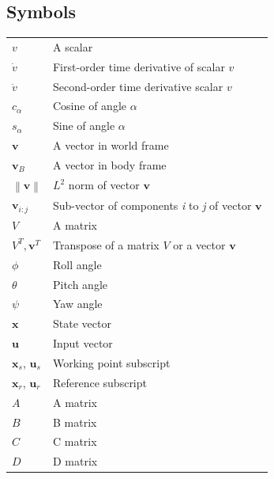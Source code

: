 \documentclass[a4paper, 12pt]{report}
\newcommand\norm[1]{\left\lVert#1\right\rVert}
\begin{document}
\subsection*{Symbols}
\begin{table}[h]
\centering
\begin{tabular}{p{8cm} p{8cm}}
$v$ \dotfill & A scalar \\
$\dot v$ \dotfill & First-order time derivative of scalar $v$ \\
$ \ddot v$ \dotfill & Second-order time derivative scalar $v$\\
$c_{\alpha}$ \dotfill & Cosine of angle $\alpha$ \\
$s_{\alpha}$ \dotfill & Sine of angle $\alpha$ \\
$\boldsymbol{v}$ \dotfill & A vector in world frame \\
$\boldsymbol{v}_B$ \dotfill & A vector in body frame \\
$\norm{\boldsymbol{v}}$ \dotfill & $L^2$ norm of vector $\boldsymbol{v}$ \\
$\boldsymbol{v}_{i:j}$ \dotfill & Sub-vector of components  \emph{i} to \emph{j} of vector $\boldsymbol{v}$\\
$V$ \dotfill & A matrix \\
$V^T,\boldsymbol{v}^T$ \dotfill & Transpose of a matrix $V$ or a vector $\boldsymbol{v}$ \\
$\phi$ \dotfill & Roll angle \\
$\theta$ \dotfill & Pitch angle \\
$\psi$ \dotfill & Yaw angle \\
$\boldsymbol{x}$ \dotfill & State vector \\
$\boldsymbol{u}$ \dotfill & Input vector \\
$\boldsymbol{x}_s$, $\boldsymbol{u}_s$ \dotfill & Working point subscript \\
$\boldsymbol{x}_r$, $\boldsymbol{u}_r$ \dotfill & Reference subscript \\
$A$ \dotfill & A matrix \\
$B$ \dotfill & B matrix \\
$C$ \dotfill & C matrix \\
$D$ \dotfill & D matrix \\
\end{tabular}
\end{table}
\end{document}
